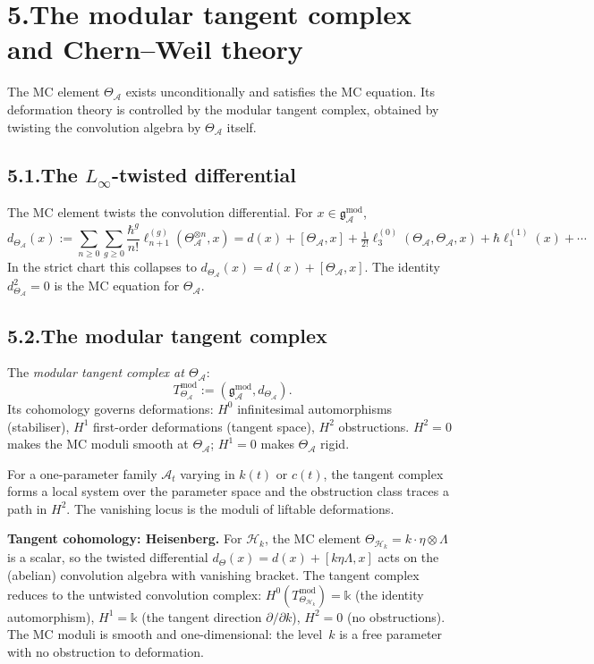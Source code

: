 \documentclass[11pt,reqno]{amsart}
\theoremstyle{definition}
\theoremstyle{remark}
\providecommand{\cA}{\mathcal{A}}
\providecommand{\cH}{\mathcal{H}}
\providecommand{\gAmod}{\mathfrak{g}^{\mathrm{mod}}_\cA}
\providecommand{\Bbbk}{\mathbb{k}}
\numberwithin{equation}{section}
\begin{document}
\section*{5.\quad The modular tangent complex and Chern--Weil theory}

The MC element $\Theta_\cA$ exists unconditionally and satisfies the
MC equation. Its deformation theory is controlled by the modular
tangent complex, obtained by twisting the convolution algebra by
$\Theta_\cA$ itself.

\subsection*{5.1.\enspace The $L_\infty$-twisted differential}

The MC element twists the convolution differential. For $x\in\gAmod$,
\[
d_{\Theta_\cA}(x):=\sum_{n\ge 0}\sum_{g\ge 0}\frac{\hbar^g}{n!}\ell_{n+1}^{(g)}(\Theta_\cA^{\otimes n},x)=d(x)+[\Theta_\cA,x]+\tfrac{1}{2!}\ell_3^{(0)}(\Theta_\cA,\Theta_\cA,x)+\hbar\ell_1^{(1)}(x)+\cdots
\]
In the strict chart this collapses to $d_{\Theta_\cA}(x)=d(x)+[\Theta_\cA,x]$.
The identity $d_{\Theta_\cA}^2=0$ is the MC equation for $\Theta_\cA$.

\subsection*{5.2.\enspace The modular tangent complex}

The \emph{modular tangent complex at $\Theta_\cA$}:
\[
T^{\mathrm{mod}}_{\Theta_\cA}:=(\gAmod,d_{\Theta_\cA}).
\]
Its cohomology governs deformations: $H^0$ infinitesimal automorphisms
(stabiliser), $H^1$ first-order deformations (tangent space), $H^2$
obstructions. $H^2=0$ makes the MC moduli smooth at $\Theta_\cA$;
$H^1=0$ makes $\Theta_\cA$ rigid.

For a one-parameter family $\cA_t$ varying in $k(t)$ or $c(t)$, the
tangent complex forms a local system over the parameter space and
the obstruction class traces a path in $H^2$. The vanishing locus
is the moduli of liftable deformations.

\medskip
\noindent\textbf{Tangent cohomology: Heisenberg.}\enspace
For $\cH_k$, the MC element $\Theta_{\cH_k}=k\cdot\eta\otimes\Lambda$
is a scalar, so the twisted differential $d_{\Theta}(x)=d(x)+[k\eta\Lambda,x]$
acts on the (abelian) convolution algebra with vanishing bracket.
The tangent complex reduces to the untwisted convolution complex:
$H^0(T^{\mathrm{mod}}_{\Theta_{\cH_k}})=\Bbbk$ (the identity
automorphism),
$H^1=\Bbbk$ (the tangent direction $\partial/\partial k$),
$H^2=0$ (no obstructions). The MC moduli is smooth and
one-dimensional: the level~$k$ is a free parameter with no
obstruction to deformation.
\end{document}
